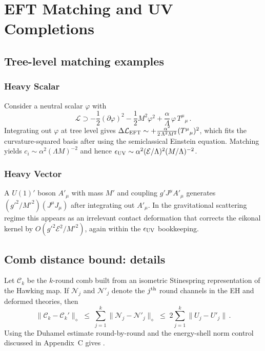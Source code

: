 \documentclass[aps,prd,preprint,onecolumn,superscriptaddress,nofootinbib,longbibliography,floatfix,11pt,showpacs,showkeys]{revtex4-2}
\theoremstyle{plain}
\theoremstyle{definition}
\theoremstyle{remark}
\begin{document}
\label{app:gw-sim} %

\section{EFT Matching and UV Completions}
\label{app:new-physics-eft}

\subsection{Tree-level matching examples}
\subsubsection{Heavy Scalar}
Consider a neutral scalar $\varphi$ with
\begin{equation}
\mathcal{L}\supset -\frac{1}{2}(\partial\varphi)^2-\frac{1}{2}M^2\varphi^2+\frac{\alpha}{\Lambda}\,\varphi\,T^\mu{}_\mu\,.
\end{equation}
Integrating out $\varphi$ at tree level gives $\Delta\mathcal{L}_{\rm EFT}\sim +\frac{\alpha^2}{2\,\Lambda^2 M^2}(T^\mu{}_\mu)^2$, which fits the curvature-squared basis after using the semiclassical Einstein equation. Matching yields $c_i\sim \alpha^2(\Lambda M)^{-2}$ and hence $\epsilon_{\rm UV}\sim \alpha^2(\mathcal{E}/\Lambda)^2(M/\Lambda)^{-2}$.

\subsubsection{Heavy Vector}
A $U(1)'$ boson $A'_\mu$ with mass $M'$ and coupling $g' J^\mu A'_\mu$ generates $(g'^2/M'^2)(J^\mu J_\mu)$ after integrating out $A'_\mu$. In the gravitational scattering regime this appears as an irrelevant contact deformation that corrects the eikonal kernel by $O(g'^2 \mathcal{E}^2/M'^2)$, again within the $\epsilon_{\rm UV}$ bookkeeping.

\subsection{Comb distance bound: details}
Let $\mathcal{C}_k$ be the $k$-round comb built from an isometric Stinespring representation of the Hawking map. If $\mathcal{N}_j$ and $\mathcal{N}'_j$ denote the $j^{\rm th}$ round channels in the EH and deformed theories, then
\begin{equation}
\big\|\mathcal{C}_k-\mathcal{C}_k'\big\|_\diamond \;\le\; \sum_{j=1}^k \big\|\mathcal{N}_j-\mathcal{N}'_j\big\|_\diamond \;\le\; 2\sum_{j=1}^k \big\|U_j-U'_j\big\|\,.
\end{equation}
Using the Duhamel estimate round-by-round and the energy-shell norm control discussed in Appendix~C gives .
\end{document}
